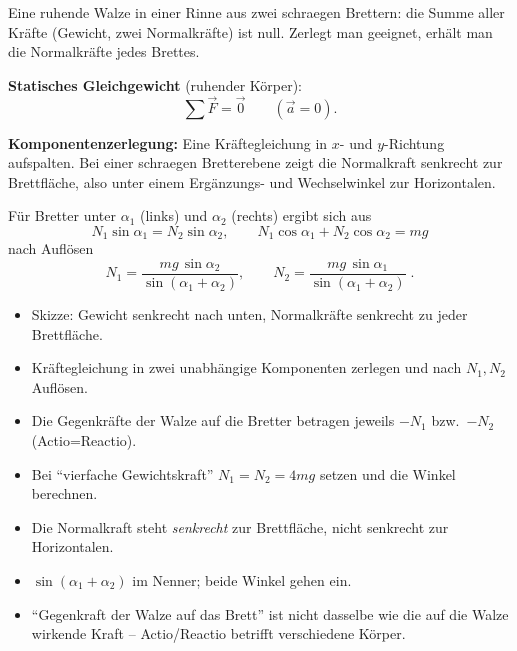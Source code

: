 

Eine ruhende Walze in einer Rinne aus zwei schraegen Brettern: die
Summe aller Kräfte (Gewicht, zwei Normalkräfte) ist null. Zerlegt man
geeignet, erhält man die Normalkräfte jedes Brettes.

\begin{werkzeugkasten}[Werkzeuge]
\textbf{Statisches Gleichgewicht} (ruhender Körper):
\begin{equation}
  \sum\vec F=\vec 0\qquad(\vec a=0).
\end{equation}

\textbf{Komponentenzerlegung:} Eine Kräftegleichung in
$x$- und $y$-Richtung aufspalten. Bei einer schraegen Bretterebene zeigt
die Normalkraft senkrecht zur Brettfläche, also unter einem
Erg{\"a}nzungs- und Wechselwinkel zur Horizontalen.

Für Bretter unter $\alpha_1$ (links) und $\alpha_2$ (rechts) ergibt sich
aus
\begin{equation}
  N_1\sin\alpha_1=N_2\sin\alpha_2,\qquad
  N_1\cos\alpha_1+N_2\cos\alpha_2=mg
\end{equation}
nach Auflösen
\begin{equation}
  N_1=\frac{mg\,\sin\alpha_2}{\sin(\alpha_1+\alpha_2)},\qquad
  N_2=\frac{mg\,\sin\alpha_1}{\sin(\alpha_1+\alpha_2)}\;.
\end{equation}
\end{werkzeugkasten}

\begin{werkzeugkasten}[Vorgehen]
\begin{itemize}
  \item Skizze: Gewicht senkrecht nach unten, Normalkr{\"a}fte senkrecht zu
        jeder Brettfläche.
  \item Kräftegleichung in zwei unabhängige Komponenten zerlegen und
        nach $N_1,N_2$ Auflösen.
  \item Die Gegenkräfte der Walze auf die Bretter betragen jeweils
        $-N_1$ bzw.\ $-N_2$ (Actio=Reactio).
  \item Bei ``vierfache Gewichtskraft'' $N_1=N_2=4mg$ setzen und die
        Winkel berechnen.
\end{itemize}
\end{werkzeugkasten}

\begin{achtung}
\begin{itemize}
  \item Die Normalkraft steht \emph{senkrecht} zur Brettfläche, nicht
        senkrecht zur Horizontalen.
  \item $\sin(\alpha_1+\alpha_2)$ im Nenner; beide Winkel gehen ein.
  \item ``Gegenkraft der Walze auf das Brett'' ist nicht dasselbe wie die
        auf die Walze wirkende Kraft -- Actio/Reactio betrifft
        verschiedene Körper.
\end{itemize}
\end{achtung}
